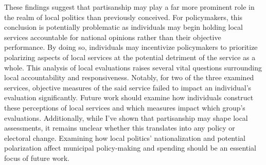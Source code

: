 These findings suggest that partisanship may play a far more prominent role in the realm of local politics than previously conceived. For policymakers, this conclusion is potentially problematic as individuals may begin holding local services accountable for national opinions rather than their objective performance. By doing so, individuals may incentivize policymakers to prioritize polarizing aspects of local services at the potential detriment of the service as a whole. This analysis of local evaluations raises several vital questions surrounding local accountability and responsiveness. Notably, for two of the three examined services, objective measures of the said service failed to impact an individual's evaluation significantly. Future work should examine how individuals construct these perceptions of local services and which measures impact which group's evaluations. Additionally, while I've shown that partisanship may shape local assessments, it remains unclear whether this translates into any policy or electoral change. Examining how local politics' nationalization and potential polarization affect municipal policy-making and spending should be an essential focus of future work.


